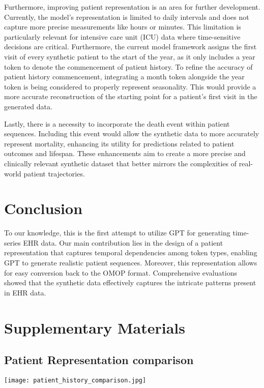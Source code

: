 \begin{multicols}{2}
Furthermore, improving patient representation is an area for further development. Currently, the model's representation is limited to daily intervals and does not capture more precise measurements like hours or minutes. This limitation is particularly relevant for intensive care unit (ICU) data where time-sensitive decisions are critical. Furthermore, the current model framework assigns the first visit of every synthetic patient to the start of the year, as it only includes a year token to denote the commencement of patient history. To refine the accuracy of patient history commencement, integrating a month token alongside the year token is being considered to properly represent seasonality. This would provide a more accurate reconstruction of the starting point for a patient's first visit in the generated data. 

Lastly, there is a necessity to incorporate the death event within patient sequences. Including this event would allow the synthetic data to more accurately represent mortality, enhancing its utility for predictions related to patient outcomes and lifespan. These enhancements aim to create a more precise and clinically relevant synthetic dataset that better mirrors the complexities of real-world patient trajectories.

\section{Conclusion}
To our knowledge, this is the first attempt to utilize GPT for generating time-series EHR data. Our main contribution lies in the design of a patient representation that captures temporal dependencies among token types, enabling GPT to generate realistic patient sequences. Moreover, this representation allows for easy conversion back to the OMOP format. Comprehensive evaluations showed that the synthetic data effectively captures the intricate patterns present in EHR data.

\end{multicols}

\newpage
\section{Supplementary Materials}
\subsection{Patient Representation comparison}
\begin{Figure}
    \centering
    \texttt{[image: patient\_history\_comparison.jpg]}
    \label{patient_history_comparison}
\end{Figure}

